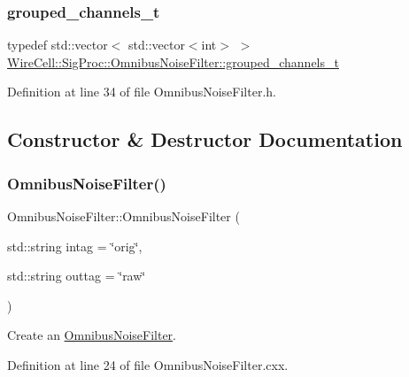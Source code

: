 \subsubsection{\texorpdfstring{grouped\+\_\+channels\+\_\+t}{grouped\_channels\_t}}
{\footnotesize\ttfamily typedef std\+::vector$<$ std\+::vector$<$int$>$ $>$ \hyperlink{class_wire_cell_1_1_sig_proc_1_1_omnibus_noise_filter_a9f1abbd77ac8a8b21fcc71a9578d650e}{Wire\+Cell\+::\+Sig\+Proc\+::\+Omnibus\+Noise\+Filter\+::grouped\+\_\+channels\+\_\+t}}



Definition at line 34 of file Omnibus\+Noise\+Filter.\+h.



\subsection{Constructor \& Destructor Documentation}
\mbox{\label{class_wire_cell_1_1_sig_proc_1_1_omnibus_noise_filter_aa968cf19dcd4e95020cc7959deffcc63}} 
\subsubsection{\texorpdfstring{Omnibus\+Noise\+Filter()}{OmnibusNoiseFilter()}}
{\footnotesize\ttfamily Omnibus\+Noise\+Filter\+::\+Omnibus\+Noise\+Filter (\begin{DoxyParamCaption}\item[{std\+::string}]{intag = {\ttfamily \char`\"{}orig\char`\"{}},  }\item[{std\+::string}]{outtag = {\ttfamily \char`\"{}raw\char`\"{}} }\end{DoxyParamCaption})}



Create an \hyperlink{class_wire_cell_1_1_sig_proc_1_1_omnibus_noise_filter}{Omnibus\+Noise\+Filter}. 



Definition at line 24 of file Omnibus\+Noise\+Filter.\+cxx.

\mbox{\label{class_wire_cell_1_1_sig_proc_1_1_omnibus_noise_filter_ac26a3997c8b8640c2a43b4bd1cec03fc}} 
